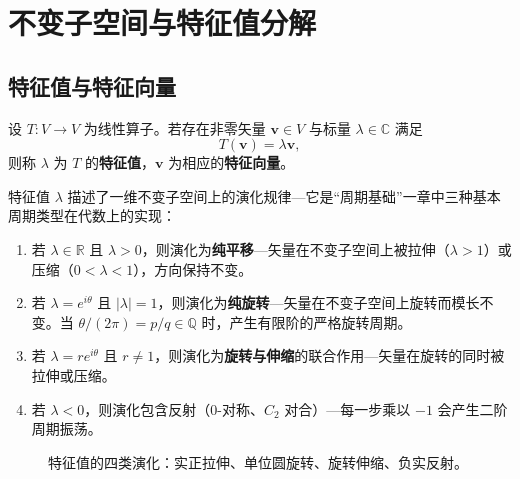 \section{\texorpdfstring{不变子空间与特征值分解}{不变子空间与特征值分解}}

\subsection{\texorpdfstring{特征值与特征向量}{特征值与特征向量}}

\begin{definition}[特征值与特征向量]\label{def:eigenvalue_eigenvector}
设 $T: V \to V$ 为线性算子。若存在非零矢量 $\mathbf{v} \in V$ 与标量 $\lambda \in \mathbb{C}$ 满足
\[
T(\mathbf{v}) = \lambda \mathbf{v},
\]
则称 $\lambda$ 为 $T$ 的\textbf{特征值}，$\mathbf{v}$ 为相应的\textbf{特征向量}。

特征值 $\lambda$ 描述了一维不变子空间上的演化规律---它是“周期基础”一章中三种基本周期类型在代数上的实现：
\begin{enumerate}[label=(\roman*)]
    \item 若 $\lambda \in \mathbb{R}$ 且 $\lambda > 0$，则演化为\textbf{纯平移}---矢量在不变子空间上被拉伸（$\lambda > 1$）或压缩（$0 < \lambda < 1$），方向保持不变。
    \item 若 $\lambda = e^{i\theta}$ 且 $|\lambda| = 1$，则演化为\textbf{纯旋转}---矢量在不变子空间上旋转而模长不变。当 $\theta/(2\pi) = p/q \in \mathbb{Q}$ 时，产生有限阶的严格旋转周期。
    \item 若 $\lambda = re^{i\theta}$ 且 $r \neq 1$，则演化为\textbf{旋转与伸缩}的联合作用---矢量在旋转的同时被拉伸或压缩。
    \item 若 $\lambda < 0$，则演化包含反射（$0$-对称、$C_2$ 对合）---每一步乘以 $-1$ 会产生二阶周期振荡。
\end{enumerate}
\end{definition}

\begin{figure}[htbp]
\centering
{}
\caption{特征值的四类演化：实正拉伸、单位圆旋转、旋转伸缩、负实反射。}
\label{fig:eigenvalue_motion_types}
\end{figure}

